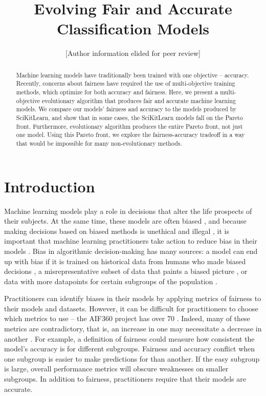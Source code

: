 \documentclass[10pt]{acmart}
\title{Evolving Fair and Accurate Classification Models}
\author{[Author information elided for peer review]}
\begin{document}
\begin{abstract}
Machine learning models have traditionally been trained with one objective -- accuracy. Recently, concerns about fairness have required the use of multi-objective training methods, which optimize for both accuracy and fairness. Here, we present a multi-objective evolutionary algorithm that produces fair and accurate machine learning models. We compare our models' fairness and accuracy to the models produced by SciKitLearn, and show that in some cases, the SciKitLearn models fall on the Pareto front. Furthermore,  evolutionary algorithm produces the entire Pareto front, not just one model. Using this Pareto front, we explore the fairness-accuracy tradeoff in a way that would be impossible for many non-evolutionary methods.
\end{abstract}


\maketitle
\section{Introduction}
Machine learning models play a role in decisions that alter the life prospects of their subjects. At the same time, these models are often biased \citep{Angwin:2016}, and because making decisions based on biased methods is unethical and illegal \citep{Barocas:2016}, it is important that machine learning practitioners take action to reduce bias in their models \citep{Binns:2017}. Bias in algorithmic decision-making has many sources: a model can end up with bias if it is trained on historical data from humans who made biased decisions \citep{Calders:2013}, a misrepresentative subset of data that paints a biased picture \citep{Suresh:2019}, or data with more datapoints for certain subgroups of the population \citep{Torralba:2011}.

Practitioners can identify biases in their models by applying metrics of fairness to their models and datasets. However, it can be difficult for practitioners to choose which metrics to use – the AIF360 project has over 70 \citep{Bellamy:2018}. Indeed, many of these metrics are contradictory, that is, an increase in one may necessitate a decrease in another \citep{Kleinberg:2016}. For example, a definition of fairness could measure how consistent the model’s accuracy is for different subgroups. Fairness and accuracy conflict when one subgroup is easier to make predictions for than another. If the easy subgroup is large, overall performance metrics will obscure weaknesses on smaller subgroups. In addition to fairness, practitioners require that their models are accurate.
\end{document}
